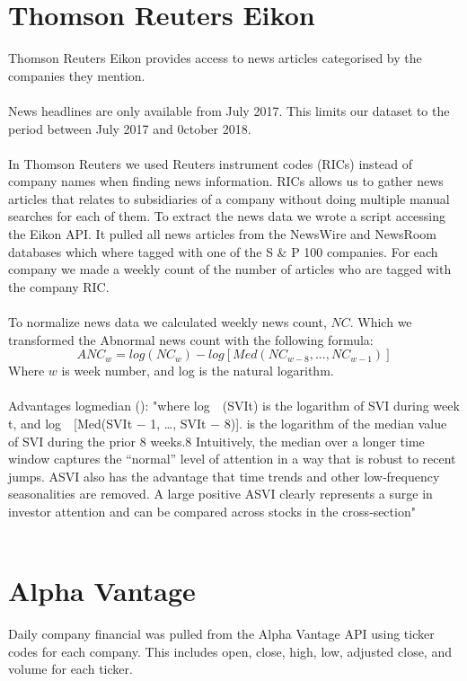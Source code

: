 \section{Thomson Reuters Eikon}
Thomson Reuters Eikon provides access to news articles categorised by the companies they mention.
\\\\
News headlines are only available from July 2017. This limits our dataset to the period between July 2017 and 0ctober 2018.
\\\\
 In Thomson Reuters we used Reuters instrument codes (RICs) instead of company names when finding news information. RICs allows us to  gather news articles that relates to subsidiaries of a company without doing multiple manual searches for each of them. To extract the news data we wrote a script accessing the Eikon API. It pulled all news articles from the NewsWire and NewsRoom databases which where tagged with one of the S \& P 100 companies. For each company we made a weekly count of the number of articles who are tagged with the company RIC.
\\\\
To normalize news data we calculated weekly news count, $NC$. Which we transformed the Abnormal news count with the following formula:
\begin{equation}
   \label{abnormal_news} 
   ANC_{w} = log(NC_{w}) - log[Med(NC_{w-8},...,NC_{w-1})] 
\end{equation}
Where $w$ is week number, and log is the natural logarithm.
\\\\
Advantages logmedian (\cite{engelberg}): "where log (SVIt) is the logarithm of SVI during week t, and log [Med(SVIt − 1, …, SVIt − 8)]. is the logarithm of the median value of SVI during the prior 8 weeks.8 Intuitively, the median over a longer time window captures the “normal” level of attention in a way that is robust to recent jumps. ASVI also has the advantage that time trends and other low‐frequency seasonalities are removed. A large positive ASVI clearly represents a surge in investor attention and can be compared across stocks in the cross‐section"
\\\\
\section{Alpha Vantage}
Daily company financial was pulled from the Alpha Vantage API using ticker codes for each company. This includes open, close, high, low, adjusted close, and volume for each ticker. 
